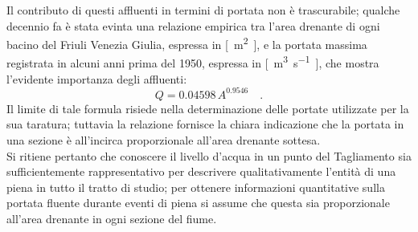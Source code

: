 %
Il contributo di questi affluenti in termini di portata non è trascurabile; qualche decennio fa è stata evinta una relazione empirica tra l'area drenante di ogni bacino del Friuli Venezia Giulia, espressa in \si{[\m\tothe{2}]}, e la portata massima registrata in alcuni anni prima del 1950, espressa in \si{[\m\tothe{3}\per\s]},  che mostra l'evidente importanza degli affluenti:
%
\begin{equation}
	\label{eq:area-portata-mosetti}
	Q = 0.04598 \, A^{0.9546}	\quad	.
\end{equation}
%
Il limite di tale formula risiede nella determinazione delle portate utilizzate per la sua taratura; tuttavia la relazione fornisce la chiara indicazione che la portata in una sezione è all'incirca proporzionale all'area drenante sottesa.
\\
Si ritiene pertanto che conoscere il livello d'acqua in un punto del Tagliamento sia sufficientemente rappresentativo per descrivere qualitativamente l'entità di una piena in tutto il tratto di studio; per ottenere informazioni quantitative sulla portata fluente durante eventi di piena si assume che questa sia proporzionale all'area drenante in ogni sezione del fiume.

